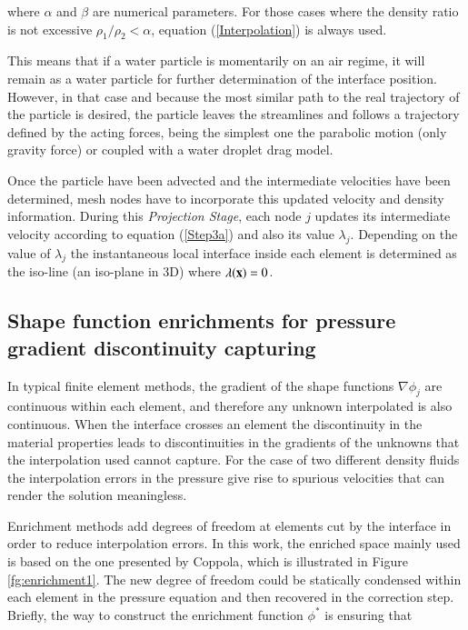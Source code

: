  
 
 where $\alpha$ and $\beta$ are numerical parameters. For those cases where the density ratio is not excessive $\rho_1/\rho_2<\alpha$, equation (\ref{Interpolation}) is always used.
 
 This means that if a water particle is momentarily on an air regime, it will remain as a water particle for further determination of the interface position. However, in that case and because the most similar path to the real trajectory of the particle is desired, the particle leaves the streamlines and follows a trajectory defined by the acting forces, being the simplest one the parabolic motion (only gravity force) or coupled with a water droplet drag model.

Once the particle have been advected and the intermediate velocities have been determined, mesh nodes have to incorporate this updated velocity and density information. During this \textit{Projection Stage}, each node $j$ updates its intermediate velocity according to equation (\ref{Step3a}) and also its value $\lambda_j$. Depending on the value of $\lambda_j$ the instantaneous local interface inside each element is determined as the iso-line (an iso-plane in 3D) where $\lambda(\mathbf{x})=0$.

\subsection{Shape function enrichments for pressure gradient discontinuity capturing}

In typical finite element methods, the gradient of the shape functions $\nabla\phi_j$ are continuous within each element, and therefore any unknown interpolated is also continuous. When the interface crosses an element the discontinuity in the material properties leads to discontinuities in the gradients of the unknowns that the interpolation used cannot capture. For the case of two different density fluids the interpolation errors in the pressure give rise to spurious velocities that can render the solution meaningless.

Enrichment methods add degrees of freedom at elements cut by the interface in order to reduce interpolation errors. In this work, the enriched space mainly used is based on the one presented by Coppola\cite{Coppola05}, which is illustrated in Figure \ref{fg:enrichment1}. The new degree of freedom could be statically condensed within each element in the pressure equation and then recovered in the correction step. Briefly, the way to construct the enrichment function $\phi^*$ is ensuring that

